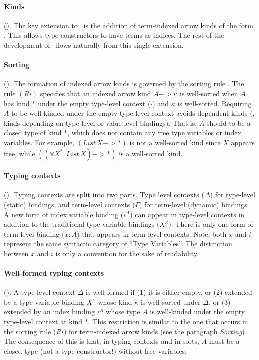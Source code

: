 \paragraph{Kinds\!}().\;
The key extension to \Fw\ is the addition of term-indexed arrow kinds of
the form . This allows type constructors to have terms
as indices. The rest of the development of \Fi\ flows naturally from
this single extension.

\paragraph{Sorting\!}().\; \label{sorting}
The formation of indexed arrow kinds is
governed by the sorting rule . The rule $(Ri)$ specifies that
an indexed arrow kind $A -> \kappa$ is well-sorted when $A$ has kind $*$
under the empty type-level context ($\cdot$) and $\kappa$ is well-sorted.
Requiring $A$ to be well-kinded under the empty type-level context avoids
dependent kinds (\ie, kinds depending on type-level or value level bindings).
That is, $A$ should to be a closed type of kind $*$,
which does not contain any free type variables or index variables.
For example, $(\textit{List}\,X -> *)$ is not a well-sorted kind since $X$
appears free, while $((\forall X^{*}\!.\,\textit{List}\,X) -> *)$ is a well-sorted kind.

\paragraph{Typing contexts\!}().\;
Typing contexts are split into two parts.
Type level contexts ($\Delta$) for type-level (static) bindings,
and term-level contexts ($\Gamma$) for term-level (dynamic) bindings.
A new form of index variable binding ($i^A$) can appear in type-level contexts
in addition to the traditional type variable bindings ($X^\kappa$).
There is only one form of term-level binding ($x:A$) that appears in
term-level contexts. Note, both $x$ and $i$ represent the same
syntactic category of ``Type Variables''. The distinction between
$x$ and $i$ is only a convention for the sake of readability.

\paragraph{Well-formed typing contexts\!}().\;
A type-level context $\Delta$ is well-formed if (1) it is either empty,
or (2) extended by a type variable binding $X^\kappa$ whose kind $\kappa$ is
well-sorted under $\Delta$, or (3) extended by an index binding $i^A$
whose type $A$ is well-kinded under the empty type-level context at kind $*$.
This restriction is similar to the one that occurs in the sorting rule ($Ri$)
for term-indexed arrow kinds (see the paragraph {\textit{Sorting}}).
The consequence of this is that, in typing contexts and in sorts,
$A$ must be a closed type (not a type constructor!) without free variables.


